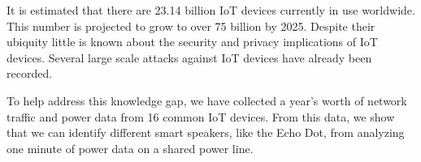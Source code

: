 It is estimated that there are 23.14 billion IoT devices currently in use worldwide. This number is projected to grow to over 75 billion by 2025. Despite their ubiquity little is known about the security and privacy implications of IoT devices. Several large scale attacks against IoT devices have already been recorded.

To help address this knowledge gap, we have collected a year’s worth of network traffic and power data from 16 common IoT devices. From this data, we show that we can identify different smart speakers, like the Echo Dot, from analyzing one minute of power data on a shared power line.